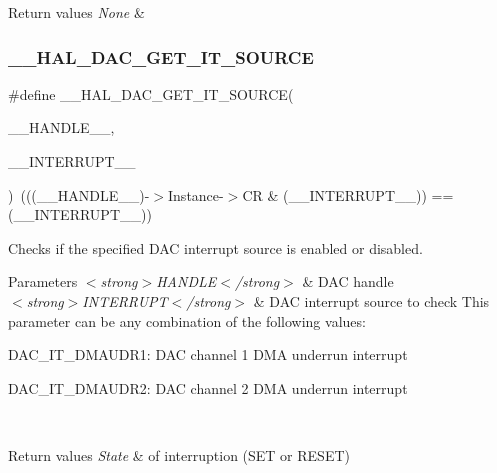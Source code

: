 \begin{DoxyRetVals}{Return values}
{\em None} & \\
\hline
\end{DoxyRetVals}
\mbox{\label{group___d_a_c___exported___macros_gaa1445e6fd0871e128a57dd01aa09660c}} 
\subsubsection{\texorpdfstring{\_\_HAL\_DAC\_GET\_IT\_SOURCE}{\_\_HAL\_DAC\_GET\_IT\_SOURCE}}
{\footnotesize\ttfamily \#define \+\_\+\+\_\+\+H\+A\+L\+\_\+\+D\+A\+C\+\_\+\+G\+E\+T\+\_\+\+I\+T\+\_\+\+S\+O\+U\+R\+CE(\begin{DoxyParamCaption}\item[{}]{\+\_\+\+\_\+\+H\+A\+N\+D\+L\+E\+\_\+\+\_\+,  }\item[{}]{\+\_\+\+\_\+\+I\+N\+T\+E\+R\+R\+U\+P\+T\+\_\+\+\_\+ }\end{DoxyParamCaption})~(((\+\_\+\+\_\+\+H\+A\+N\+D\+L\+E\+\_\+\+\_\+)-\/$>$Instance-\/$>$CR \& (\+\_\+\+\_\+\+I\+N\+T\+E\+R\+R\+U\+P\+T\+\_\+\+\_\+)) == (\+\_\+\+\_\+\+I\+N\+T\+E\+R\+R\+U\+P\+T\+\_\+\+\_\+))}



Checks if the specified D\+AC interrupt source is enabled or disabled. 


\begin{DoxyParams}{Parameters}
{\em $<$strong$>$\+H\+A\+N\+D\+L\+E$<$/strong$>$} & D\+AC handle \\
\hline
{\em $<$strong$>$\+I\+N\+T\+E\+R\+R\+U\+P\+T$<$/strong$>$} & D\+AC interrupt source to check This parameter can be any combination of the following values\+: \begin{DoxyItemize}
\item D\+A\+C\+\_\+\+I\+T\+\_\+\+D\+M\+A\+U\+D\+R1\+: D\+AC channel 1 D\+MA underrun interrupt \item D\+A\+C\+\_\+\+I\+T\+\_\+\+D\+M\+A\+U\+D\+R2\+: D\+AC channel 2 D\+MA underrun interrupt \end{DoxyItemize}
\\
\hline
\end{DoxyParams}

\begin{DoxyRetVals}{Return values}
{\em State} & of interruption (S\+ET or R\+E\+S\+ET) \\
\hline
\end{DoxyRetVals}
\mbox{\label{group___d_a_c___exported___macros_gaeed5419f40f68699d0bfc088d122ebda}} 
